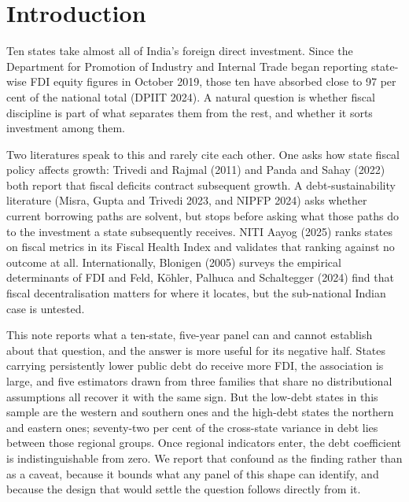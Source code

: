 \documentclass[12pt]{article}
\begin{document}

\section{Introduction}

Ten states take almost all of India's foreign direct investment. Since the
Department for Promotion of Industry and Internal Trade began reporting
state-wise FDI equity figures in October 2019, those ten have absorbed close to
97 per cent of the national total (DPIIT 2024). A natural question is whether
fiscal discipline is part of what separates them from the rest, and whether it
sorts investment among them.

Two literatures speak to this and rarely cite each other. One asks how state
fiscal policy affects growth: Trivedi and Rajmal (2011) and Panda and Sahay
(2022) both report that fiscal deficits contract subsequent growth. A
debt-sustainability literature (Misra, Gupta and Trivedi 2023, and NIPFP 2024)
asks whether current borrowing paths are solvent, but stops before asking what
those paths do to the investment a state subsequently receives. NITI Aayog (2025)
ranks states on fiscal metrics in its Fiscal Health Index and validates that
ranking against no outcome at all. Internationally, Blonigen (2005) surveys the
empirical determinants of FDI and Feld, Köhler, Palhuca and Schaltegger (2024)
find that fiscal decentralisation matters for where it locates, but the
sub-national Indian case is untested.

This note reports what a ten-state, five-year panel can and cannot establish
about that question, and the answer is more useful for its negative half. States
carrying persistently lower public debt do receive more FDI, the association is
large, and five estimators drawn from three families that share no distributional
assumptions all recover it with the same sign. But the low-debt states in this
sample are the western and southern ones and the high-debt states the northern
and eastern ones; seventy-two per cent of the cross-state variance in debt lies
between those regional groups. Once regional indicators enter, the debt
coefficient is indistinguishable from zero. We report that confound as the
finding rather than as a caveat, because it bounds what any panel of this shape
can identify, and because the design that would settle the question follows
directly from it.
\end{document}
